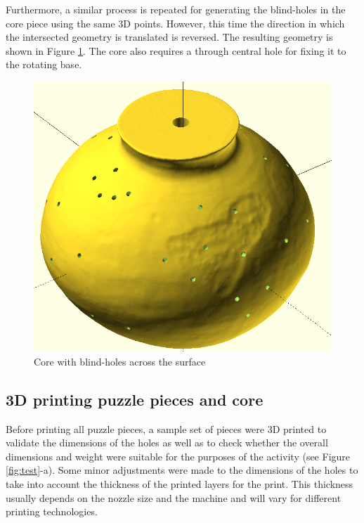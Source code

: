 \documentclass[acmlarge,screen]{acmart}
\begin{document}
Furthermore, a similar process is repeated for generating the blind-holes in the core piece using the same 3D points. However, this time the direction in which the intersected geometry is translated is reversed. The resulting geometry is shown in Figure \ref{fig:coreholes}. The core also requires a through central hole for fixing it to the rotating base. 


\begin{figure}[h]
  \centering
  \includegraphics[width=0.6\linewidth]{images/coreholes.png}
  \caption{\label{fig:coreholes}Core with blind-holes across the surface}
\end{figure}


\subsection{3D printing puzzle pieces and core}
Before printing all puzzle pieces, a sample set of pieces were 3D printed to validate the dimensions of the holes as well as to check whether the overall dimensions and weight were suitable for the purposes of the activity (see Figure \ref{fig:test}-a). Some minor adjustments were made to the dimensions of the holes to take into account the thickness of the printed layers for the print. This thickness usually depends on the nozzle size and the machine and will vary for different printing technologies.
\end{document}
